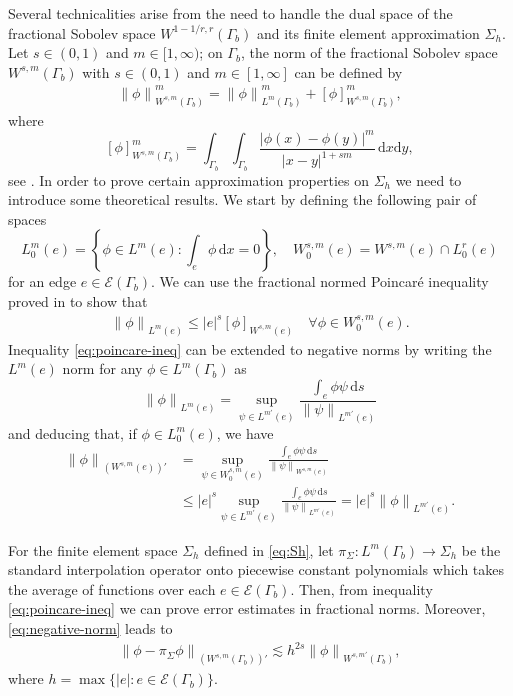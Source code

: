 \documentclass[onefignum,onetabnum]{siamart190516}
\newcommand{\dd}{\mathrm{d}}
\newcommand{\nrm}[1]{\left\lVert#1\right\rVert}
\newcommand{\Ec}{\mathcal{E}}
\begin{document}
Several technicalities arise from the need to handle the dual space of the fractional Sobolev space $W^{1-1/r,r}(\Gamma_b)$ and its finite element approximation $\Sigma_h$. Let $s\in(0,1)$ and $m\in [1,\infty)$; on $\Gamma_b$, the norm of the fractional Sobolev space $W^{s,m}(\Gamma_b)$ with $s\in(0,1)$ and $m\in [1,\infty]$ can be defined by
%
\begin{align}\label{eq:fractional_norm}
	\nrm{\phi}^m_{W^{s,m}(\Gamma_b)} = \nrm{\phi}^m_{L^m(\Gamma_b)} + [\phi]^m_{W^{s,m}(\Gamma_b)},
\end{align}
%
where
%
\[
	[\phi]^m_{W^{s,m}(\Gamma_b)} = \int_{\Gamma_b}\int_{\Gamma_b} \frac{|\phi(x) - \phi(y)|^m}{|x-y|^{1+sm}}\,\dd x\dd y,
\]
%
see \cite{nezza2012}. In order to prove certain approximation properties on $\Sigma_h$ we need to introduce some theoretical results. We start by defining the following pair of spaces
%
\[
	L_0^m(e) = \left\lbrace \phi\in L^m(e) : \int_{e} \phi\,\dd x = 0 \right\rbrace,\quad W^{s,m}_0(e) = W^{s,m}(e)\cap L^r_0(e)
\]
%
for an edge $e\in\Ec(\Gamma_b)$. We can use the fractional normed Poincar\'e inequality proved in \cite[Lemma 7.1]{ern2017} to show that
%
\begin{align}\label{eq:poincare-ineq}
	\nrm{\phi}_{L^m(e)} \leq |e|^s [\phi]_{W^{s,m}(e)} \quad \forall \phi\in W_0^{s,m}(e).
\end{align}
%
Inequality \eqref{eq:poincare-ineq} can be extended to negative norms by writing the $L^m(e)$ norm for any $\phi\in L^m(\Gamma_b)$ as
%
\[
	\nrm{\phi}_{L^m(e)} = \sup_{\psi\in L^{m'}(e)}{\frac{\int_{e}\phi\psi\,\dd s}{\nrm{\psi}_{L^{m'}(e)}}}
\]
and deducing that, if $\phi\in L^m_0(e)$, we have 
%
\begin{equation}\label{eq:negative-norm}
	\begin{split}
		\nrm{\phi}_{\left( W^{s,m}(e) \right)'} &= \sup_{\psi\in W_0^{s,m}(e)}{\frac{\int_{e}\phi\psi\,\dd s}{\nrm{\psi}_{W^{s,m}(e)}}} \\
		&\leq |e|^s \sup_{\psi\in L^{m'}(e)}{\frac{\int_{e}\phi\psi\,\dd s}{\nrm{\psi}_{L^{m'}(e)}}} = |e|^s  \nrm{\phi}_{L^{m'}(e)}.
	\end{split}
\end{equation}

For the finite element space $\Sigma_h$ defined in \eqref{eq:Sh}, let $\pi_\Sigma:L^m(\Gamma_b) \to \Sigma_h$ be the standard interpolation operator onto piecewise constant polynomials which takes the average of functions over each $e\in \Ec(\Gamma_b)$. Then, from inequality \eqref{eq:poincare-ineq} we can prove error estimates in fractional norms. Moreover,  \eqref{eq:negative-norm} leads to
%
\begin{align}
	\nrm{\phi - \pi_\Sigma\phi}_{\left( W^{s,m}(\Gamma_b) \right)'} \lesssim h^{2s} \nrm{\phi}_{W^{s,m'}(\Gamma_b)},
\end{align}
%
where $h = \max{ \{|e| : e \in \Ec(\Gamma_b)\}}$.
\end{document}
